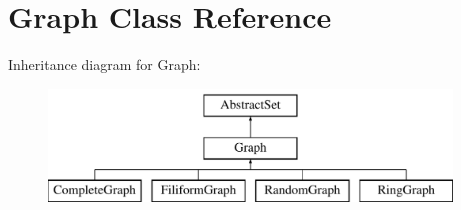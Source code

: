 \hypertarget{classGraph}{\section{Graph Class Reference}
\label{classGraph}
}
Inheritance diagram for Graph\-:\begin{figure}[H]
\begin{center}
\leavevmode
\includegraphics[height=3.000000cm]{classGraph}
\end{center}
\end{figure}
